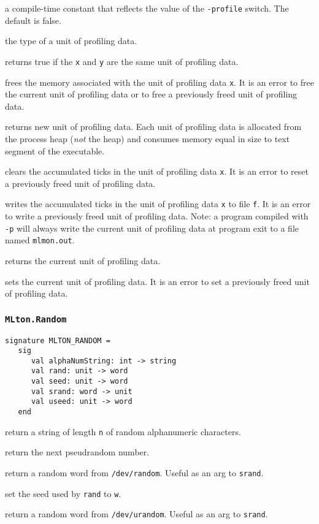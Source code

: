 \begin{description}

a compile-time constant that reflects the value of the {\tt -profile} switch.
The default is false.

 the type of a unit of profiling data.

returns true if the {\tt x} and {\tt y} are the same unit of profiling
data.

frees the memory associated with the unit of profiling data {\tt x}.
It is an error to free the current unit of profiling data or to free a
previously freed unit of profiling data.

returns new unit of profiling data.  Each unit of profiling data is
allocated from the process heap (\emph{not} the {\mlton} heap) and
consumes memory equal in size to text segment of the executable.

clears the accumulated ticks in the unit of profiling data {\tt x}.
It is an error to reset a previously freed unit of profiling data.

writes the accumulated ticks in the unit of profiling data {\tt x} to
file {\tt f}.  It is an error to write a previously freed unit of
profiling data.  Note: a program compiled with {\tt -p} will always
write the current unit of profiling data at program exit to a file
named {\tt mlmon.out}.

returns the current unit of profiling data.

sets the current unit of profiling data.  It is an error to set a
previously freed unit of profiling data.  

\end{description}

\subsubsection{\tt MLton.Random}
\begin{verbatim}
signature MLTON_RANDOM =
   sig
      val alphaNumString: int -> string
      val rand: unit -> word
      val seed: unit -> word
      val srand: word -> unit
      val useed: unit -> word
   end
\end{verbatim}

\begin{description}
return a string of length {\tt n} of random alphanumeric characters.

return the next pseudrandom number.

return a random word from {\tt /dev/random}.  Useful as an arg to {\tt srand}.

set the seed used by {\tt rand} to {\tt w}.

return a random word from {\tt /dev/urandom}.  Useful as an arg to {\tt srand}.
\end{description}

